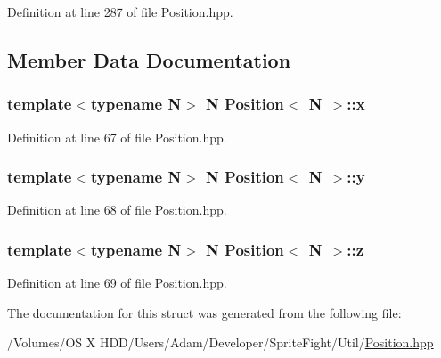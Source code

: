 Definition at line 287 of file Position.\-hpp.



\subsection{Member Data Documentation}
\hypertarget{struct_position_af908be922fc88d89d81be7d08d06f761}{
\subsubsection[{x}]{\setlength{\rightskip}{0pt plus 5cm}template$<$typename N$>$ N {\bf Position}$<$ N $>$\-::x\hspace{0.3cm}{\ttfamily [protected]}}}\label{struct_position_af908be922fc88d89d81be7d08d06f761}


Definition at line 67 of file Position.\-hpp.

\hypertarget{struct_position_af434f54a0aad8bbfc3806ebdd197aa3b}{
\subsubsection[{y}]{\setlength{\rightskip}{0pt plus 5cm}template$<$typename N$>$ N {\bf Position}$<$ N $>$\-::y\hspace{0.3cm}{\ttfamily [protected]}}}\label{struct_position_af434f54a0aad8bbfc3806ebdd197aa3b}


Definition at line 68 of file Position.\-hpp.

\hypertarget{struct_position_ac430da98504c2d4fd685c0363d728474}{
\subsubsection[{z}]{\setlength{\rightskip}{0pt plus 5cm}template$<$typename N$>$ N {\bf Position}$<$ N $>$\-::z\hspace{0.3cm}{\ttfamily [protected]}}}\label{struct_position_ac430da98504c2d4fd685c0363d728474}


Definition at line 69 of file Position.\-hpp.



The documentation for this struct was generated from the following file\-:\begin{DoxyCompactItemize}
\item 
/\-Volumes/\-O\-S X H\-D\-D/\-Users/\-Adam/\-Developer/\-Sprite\-Fight/\-Util/\hyperlink{_position_8hpp}{Position.\-hpp}\end{DoxyCompactItemize}
